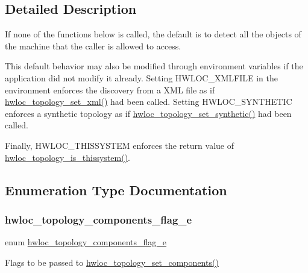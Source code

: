 \subsection{Detailed Description}
If none of the functions below is called, the default is to detect all the objects of the machine that the caller is allowed to access.

This default behavior may also be modified through environment variables if the application did not modify it already. Setting H\+W\+L\+O\+C\+\_\+\+X\+M\+L\+F\+I\+LE in the environment enforces the discovery from a X\+ML file as if \hyperlink{a00192_ga879439b7ee99407ee911b3ac64e9a25e}{hwloc\+\_\+topology\+\_\+set\+\_\+xml()} had been called. Setting H\+W\+L\+O\+C\+\_\+\+S\+Y\+N\+T\+H\+E\+T\+IC enforces a synthetic topology as if \hyperlink{a00192_ga4fab186bb6181a00bcf585825fddd38d}{hwloc\+\_\+topology\+\_\+set\+\_\+synthetic()} had been called.

Finally, H\+W\+L\+O\+C\+\_\+\+T\+H\+I\+S\+S\+Y\+S\+T\+EM enforces the return value of \hyperlink{a00193_ga68ffdcfd9175cdf40709801092f18017}{hwloc\+\_\+topology\+\_\+is\+\_\+thissystem()}. 

\subsection{Enumeration Type Documentation}
\mbox{\label{a00192_ga949f656c779208a36790feba24048b7e}} 
\subsubsection{\texorpdfstring{hwloc\+\_\+topology\+\_\+components\+\_\+flag\+\_\+e}{hwloc\_topology\_components\_flag\_e}}
{\footnotesize\ttfamily enum \hyperlink{a00192_ga949f656c779208a36790feba24048b7e}{hwloc\+\_\+topology\+\_\+components\+\_\+flag\+\_\+e}}



Flags to be passed to \hyperlink{a00192_ga9ad41adf418cee1c0ee32ba9bd4a3d36}{hwloc\+\_\+topology\+\_\+set\+\_\+components()} 

